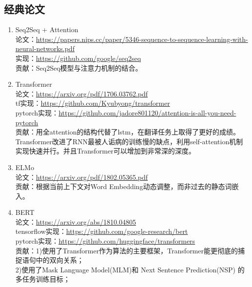 \documentclass[lang=cn,11pt,a4paper]{eleganttemplate}
\begin{document}
\subsection{经典论文}
\begin{enumerate}
    \item Seq2Seq + Attention\\
    论文：\href{https://papers.nips.cc/paper/5346-sequence-to-sequence-learning-with-neural-networks.pdf}{https://papers.nips.cc/paper/5346-sequence-to-sequence-learning-with-neural-networks.pdf}  \\
    实现：\href{https://github.com/google/seq2seq}{https://github.com/google/seq2seq}  \\
    贡献：Seq2Seq模型与注意力机制的结合。 
    \item Transformer\\
    论文：\href{https://arxiv.org/pdf/1706.03762.pdf}{https://arxiv.org/pdf/1706.03762.pdf}  \\
    tf实现：\href{https://github.com/Kyubyong/transformer}{https://github.com/Kyubyong/transformer} \\
    pytorch实现：\href{https://github.com/jadore801120/attention-is-all-you-need-pytorch}{https://github.com/jadore801120/attention-is-all-you-need-pytorch}  \\
    贡献：用全attention的结构代替了lstm，在翻译任务上取得了更好的成绩。Transformer改进了RNN最被人诟病的训练慢的缺点，利用self-attention机制实现快速并行。并且Transformer可以增加到非常深的深度。
    \item ELMo\\
    论文：\href{https://arxiv.org/pdf/1802.05365.pdf}{https://arxiv.org/pdf/1802.05365.pdf}  \\
    贡献：根据当前上下文对Word Embedding动态调整，而非过去的静态词嵌入。
    \item BERT \\
    论文：\href{https://arxiv.org/abs/1810.04805}{https://arxiv.org/abs/1810.04805}  \\
    tensorflow实现：\href{https://github.com/google-research/bert}{https://github.com/google-research/bert} \\
    pytorch实现：\href{https://github.com/huggingface/transformers}{https://github.com/huggingface/transformers}  \\
    贡献：1)使用了Transformer作为算法的主要框架，Transformer能更彻底的捕捉语句中的双向关系；\\
    2)使用了Mask Language Model(MLM)和 Next Sentence Prediction(NSP) 的多任务训练目标；\\

\end{enumerate}
\end{document}
